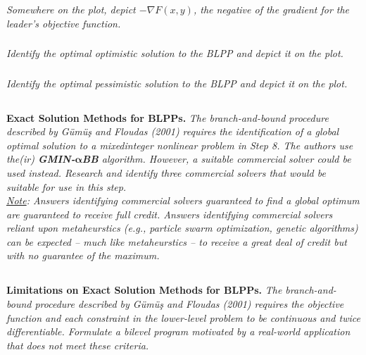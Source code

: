 \documentclass[12pt]{amsart}
\begin{document}
\subsubsection{}
\textit{Somewhere on the plot, depict $-\nabla F(x,y)$, the negative of the gradient for the leader’s objective function.}

\subsubsection{}
\textit{Identify the optimal optimistic solution to the BLPP and depict it on the plot.}

\subsubsection{}
\textit{Identify the optimal pessimistic solution to the BLPP and depict it on the plot.}



\subsection{}
\textbf{Exact Solution Methods for BLPPs.} 
\textit{The branch-and-bound procedure described by Gümüş and Floudas (2001) requires the identification of a global optimal solution to a mixedinteger nonlinear problem in Step 8. The authors use the(ir) \textbf{GMIN-}$\mathbf\alpha$\textbf{BB} algorithm. However, a suitable commercial solver could be used instead. Research and identify three commercial solvers that would be suitable for use in this step.} \\

\textit{\underline{Note}: Answers identifying commercial solvers guaranteed to find a global optimum are guaranteed to receive full credit. Answers identifying commercial solvers reliant upon metaheurstics (e.g., particle swarm optimization, genetic algorithms) can be expected -- much like metaheurstics -- to receive a great deal of credit but with no guarantee of the
maximum.}



\subsection{}
\textbf{Limitations on Exact Solution Methods for BLPPs.} 
\textit{The branch-and-bound procedure described by Gümüş and Floudas (2001) requires the objective function and each constraint in the lower-level problem to be continuous and twice differentiable. Formulate a bilevel program motivated by a real-world application that does not meet these criteria.}
\end{document}
